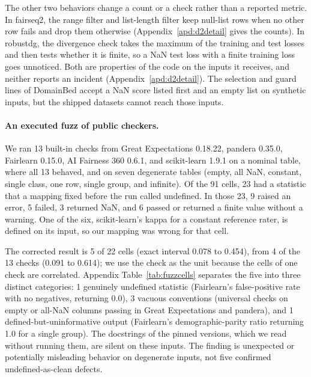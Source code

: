 \documentclass[10pt]{article}
\theoremstyle{definition}
\begin{document}
The other two behaviors change a count or a check rather than a reported metric. In fairseq2, the range filter and list-length filter keep null-list rows when no other row fails and drop them otherwise (Appendix~\ref{apd:d2detail} gives the counts). In robustdg, the divergence check takes the maximum of the training and test losses and then tests whether it is finite, so a NaN test loss with a finite training loss goes unnoticed. Both are properties of the code on the inputs it receives, and neither reports an incident (Appendix~\ref{apd:d2detail}). The selection and guard lines of DomainBed \citep{gulrajani2021search} accept a NaN score listed first and an empty list on synthetic inputs, but the shipped datasets cannot reach those inputs.

\paragraph{An executed fuzz of public checkers.} We ran 13 built-in checks from Great Expectations 0.18.22, pandera 0.35.0, Fairlearn 0.15.0, AI Fairness 360 0.6.1, and scikit-learn 1.9.1 on a nominal table, where all 13 behaved, and on seven degenerate tables (empty, all NaN, constant, single class, one row, single group, and infinite). Of the 91 cells, 23 had a statistic that a mapping fixed before the run called undefined. In those 23, 9 raised an error, 5 failed, 3 returned NaN, and 6 passed or returned a finite value without a warning. One of the six, scikit-learn's kappa for a constant reference rater, is defined on its input, so our mapping was wrong for that cell.

The corrected result is 5 of 22 cells (exact interval 0.078 to 0.454), from 4 of the 13 checks (0.091 to 0.614); we use the check as the unit because the cells of one check are correlated. Appendix Table~\ref{tab:fuzzcells} separates the five into three distinct categories: 1 genuinely undefined statistic (Fairlearn's false-positive rate with no negatives, returning 0.0), 3 vacuous conventions (universal checks on empty or all-NaN columns passing in Great Expectations and pandera), and 1 defined-but-uninformative output (Fairlearn's demographic-parity ratio returning 1.0 for a single group). The docstrings of the pinned versions, which we read without running them, are silent on these inputs. The finding is unexpected or potentially misleading behavior on degenerate inputs, not five confirmed undefined-as-clean defects.
\end{document}
